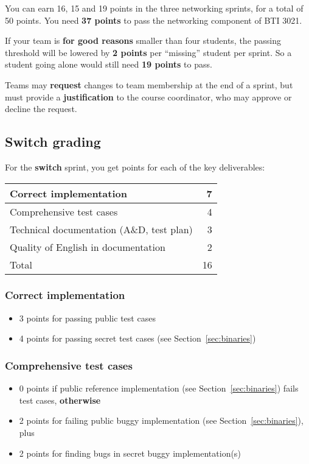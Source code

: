 \documentclass{article}
\begin{document}
You can earn 16, 15 and 19 points in the three networking sprints, for
a total of 50 points.  You need {\bf 37 points} to pass the networking
component of BTI 3021.

If your team is {\bf for good reasons} smaller than four students, the
passing threshold will be lowered by {\bf 2 points} per ``missing''
student per sprint.  So a student going alone would still need {\bf 19
  points} to pass.

Teams may {\bf request} changes to team membership at the end of a
sprint, but must provide a {\bf justification} to the course
coordinator, who may approve or decline the request.



\subsection{Switch grading}

For the {\bf switch} sprint, you get points for each of the key deliverables:
\begin{center}
\begin{tabular}{l|r}
Correct implementation                    &  7 \\ \hline
Comprehensive test cases                  &  4 \\ \hline
Technical documentation (A\&D, test plan) &  3 \\ \hline
Quality of English in documentation       &  2 \\ \hline \hline
Total                                     & 16
\end{tabular}
\end{center}

\subsubsection{Correct implementation}
\begin{itemize}
\item 3 points for passing public test cases
\item 4 points for passing secret test cases (see Section~\ref{sec:binaries})
\end{itemize}

\subsubsection{Comprehensive test cases}
\begin{itemize}
\item 0 points if public reference implementation (see Section~\ref{sec:binaries})
      fails test cases, {\bf otherwise}
\item 2 points for failing public buggy implementation (see Section~\ref{sec:binaries}),
       plus
\item 2 points for finding bugs in secret buggy implementation(s)
\end{itemize}
\end{document}
